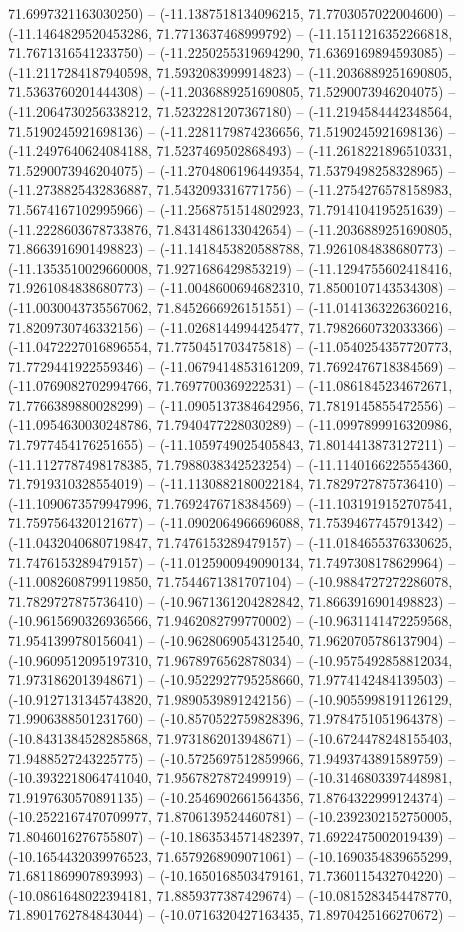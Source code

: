 71.6997321163030250) -- (-11.1387518134096215, 71.7703057022004600) -- (-11.1464829520453286, 71.7713637468999792) -- (-11.1511216352266818, 71.7671316541233750) -- (-11.2250255319694290, 71.6369169894593085) -- (-11.2117284187940598, 71.5932083999914823) -- (-11.2036889251690805, 71.5363760201444308) -- (-11.2036889251690805, 71.5290073946204075) -- (-11.2064730256338212, 71.5232281207367180) -- (-11.2194584442348564, 71.5190245921698136) -- (-11.2281179874236656, 71.5190245921698136) -- (-11.2497640624084188, 71.5237469502868493) -- (-11.2618221896510331, 71.5290073946204075) -- (-11.2704806196449354, 71.5379498258328965) -- (-11.2738825432836887, 71.5432093316771756) -- (-11.2754276578158983, 71.5674167102995966) -- (-11.2568751514802923, 71.7914104195251639) -- (-11.2228603678733876, 71.8431486133042654) -- (-11.2036889251690805, 71.8663916901498823) -- (-11.1418453820588788, 71.9261084838680773) -- (-11.1353510029660008, 71.9271686429853219) -- (-11.1294755602418416, 71.9261084838680773) -- (-11.0048600694682310, 71.8500107143534308) -- (-11.0030043735567062, 71.8452666926151551) -- (-11.0141363226360216, 71.8209730746332156) -- (-11.0268144994425477, 71.7982660732033366) -- (-11.0472227016896554, 71.7750451703475818) -- (-11.0540254357720773, 71.7729441922559346) -- (-11.0679414853161209, 71.7692476718384569) -- (-11.0769082702994766, 71.7697700369222531) -- (-11.0861845234672671, 71.7766389880028299) -- (-11.0905137384642956, 71.7819145855472556) -- (-11.0954630030248786, 71.7940477228030289) -- (-11.0997899916320986, 71.7977454176251655) -- (-11.1059749025405843, 71.8014413873127211) -- (-11.1127787498178385, 71.7988038342523254) -- (-11.1140166225554360, 71.7919310328554019) -- (-11.1130882180022184, 71.7829727875736410) -- (-11.1090673579947996, 71.7692476718384569) -- (-11.1031919152707541, 71.7597564320121677) -- (-11.0902064966696088, 71.7539467745791342) -- (-11.0432040680719847, 71.7476153289479157) -- (-11.0184655376330625, 71.7476153289479157) -- (-11.0125900949090134, 71.7497308178629964) -- (-11.0082608799119850, 71.7544671381707104) -- (-10.9884727272286078, 71.7829727875736410) -- (-10.9671361204282842, 71.8663916901498823) -- (-10.9615690326936566, 71.9462082799770002) -- (-10.9631141472259568, 71.9541399780156041) -- (-10.9628069054312540, 71.9620705786137904) -- (-10.9609512095197310, 71.9678976562878034) -- (-10.9575492858812034, 71.9731862013948671) -- (-10.9522927795258660, 71.9774142484139503) -- (-10.9127131345743820, 71.9890539891242156) -- (-10.9055998191126129, 71.9906388501231760) -- (-10.8570522759828396, 71.9784751051964378) -- (-10.8431384528285868, 71.9731862013948671) -- (-10.6724478248155403, 71.9488527243225775) -- (-10.5725697512859966, 71.9493743891589759) -- (-10.3932218064741040, 71.9567827872499919) -- (-10.3146803397448981, 71.9197630570891135) -- (-10.2546902661564356, 71.8764322999124374) -- (-10.2522167470709977, 71.8706139524460781) -- (-10.2392302152750005, 71.8046016276755807) -- (-10.1863534571482397, 71.6922475002019439) -- (-10.1654432039976523, 71.6579268909071061) -- (-10.1690354839655299, 71.6811869907893993) -- (-10.1650168503479161, 71.7360115432704220) -- (-10.0861648022394181, 71.8859377387429674) -- (-10.0815283454478770, 71.8901762784843044) -- (-10.0716320427163435, 71.8970425166270672) -- 